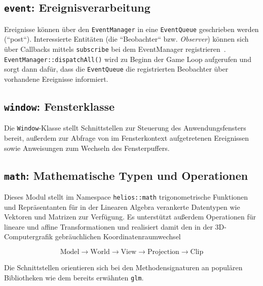 \subsection*{\texttt{event}: Ereignisverarbeitung}
Ereignisse können über den \texttt{EventManager} in eine \texttt{EventQueue} geschrieben werden (``post``).
Interessierte Entitäten (die ``Beobachter`` bzw. \textit{Observer}) können sich über Callbacks mittels \texttt{subscribe} bei dem EventManager registrieren~\cite[293 ff.]{GHJV94}.
\texttt{EventManager::dispatchAll()} wird zu Beginn der Game Loop aufgerufen und sorgt dann dafür, dass die \texttt{EventQueue} die registrierten Beobachter über vorhandene Ereignisse informiert.

\subsection*{\texttt{window}: Fensterklasse}
Die \texttt{Window}-Klasse stellt Schnittstellen zur Steuerung des Anwendungsfensters bereit, außerdem zur Abfrage von im Fensterkontext aufgetretenen Ereignissen sowie Anweisungen zum Wechseln des Fensterpuffers.


\subsection*{\texttt{math}: Mathematische Typen und Operationen}
Dieses Modul stellt im Namespace \texttt{helios::math} trigonometrische Funktionen und Repräsentanten für in der Linearen Algebra verankerte Datentypen wie Vektoren und Matrizen zur Verfügung.
Es unterstützt außerdem Operationen für lineare und affine Transformationen und realisiert damit den in der  3D-Computergrafik gebräuchlichen Koordinatenraumwechsel

\[
    \text{Model}\rightarrow\text{World}\rightarrow\text{View}\rightarrow\text{Projection}\rightarrow\text{Clip}
\]

\noindent

Die Schnittstellen orientieren sich bei den Methodensignaturen an populären Bibliotheken wie dem bereits erwähnten \texttt{glm}.

